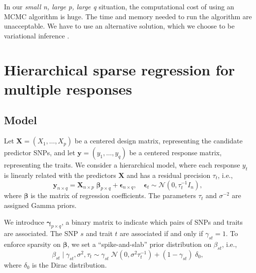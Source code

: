\documentclass[a4paper, 11pt]{report}
\numberwithin{equation}{chapter}
\begin{document}
In our \textit{small n, large p, large q} situation, the computational cost of using an MCMC algorithm is huge. The time and memory needed to run the algorithm are unacceptable. We have to use an alternative solution, which we choose to be variational inference \citep{varInf}. 

\newpage
\chapter{Hierarchical sparse regression for multiple responses}
\section{Model}
Let $\boldsymbol{X }= (X_1,\ldots,X_p)$ be a centered design matrix, representing the candidate predictor SNPs, and let $\boldsymbol{y} = (y_1,\ldots,y_q)$ be a centered response matrix, representing the traits. We consider a hierarchical model, where each response $y_t$ is linearly related with the predictors $\boldsymbol{X}$ and has a residual precision $\tau_t$, i.e.,
\begin{equation*}
\label{eq:model}
\boldsymbol{y}_{n\times q} = \boldsymbol{X}_{n \times p}\;\boldsymbol{\beta}_{p \times q}+\boldsymbol{\epsilon}_{n \times q},\quad\boldsymbol{\epsilon}_t \sim \mathcal{N}(0,\tau_t^{-1}I_n),
\end{equation*}
where $\boldsymbol{\beta}$ is the matrix of regression coefficients. The parameters $\tau_t$ and $\sigma^{-2}$ are assigned Gamma priors.

We introduce $\boldsymbol{\gamma}_{p\times q}$, a binary matrix to indicate which pairs of SNPs and traits are associated. The SNP $s$ and trait $t$ are associated if and only if $\gamma_{st} = 1$. To enforce sparsity on $\boldsymbol{\beta}$, we set a ``spike-and-slab'' prior distribution on $\beta_{st}$, i.e.,
\begin{equation*}
\beta_{st} \mid \gamma_{st},\sigma^2, \tau_t \sim \gamma_{st}\;\mathcal{N}(0,\sigma^2\tau_t^{-1})+(1-\gamma_{st})\;\delta_0,
\end{equation*}
where $\delta_0$ is the Dirac distribution.
\end{document}
